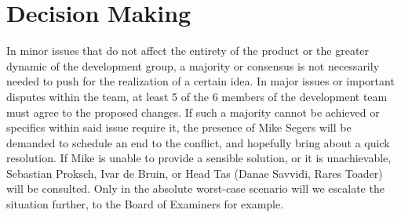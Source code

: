 \section{Decision Making}
 In minor issues that do not affect the entirety of the product or the greater dynamic of the development group, a majority or consensus is not necessarily needed to push for the realization of a certain idea. In major issues or important disputes within the team, at least 5 of the 6 members of the development team must agree to the proposed changes. If such a majority cannot be achieved or specifics within said issue require it, the presence of Mike Segers will be demanded to schedule an end to the conflict, and hopefully bring about a quick resolution. If Mike is unable to provide a sensible solution, or it is unachievable, Sebastian Proksch, Ivar de Bruin, or Head Tas (Danae Savvidi, Rares Toader) will be consulted. Only in the absolute worst-case scenario will we escalate the situation further, to the Board of Examiners for example.
